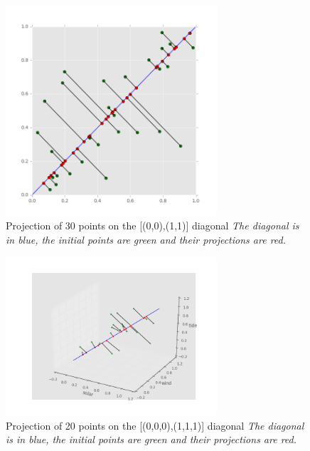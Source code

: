 \documentclass{article}
\begin{document}
\begin{figure}
  
    \includegraphics[width=0.7\textwidth]{proj2Ddiag0.png}
    \caption{Projection of 30 points on the [(0,0),(1,1)] diagonal \emph{The diagonal is in blue, the initial points are green and their projections are red.}}
\end{figure}

	\begin{figure}
  
    \includegraphics[width=0.7\textwidth]{proj3d.png}
    \caption{Projection of 20 points on the [(0,0,0),(1,1,1)] diagonal \emph{The diagonal is in blue, the initial points are green and their projections are red.}}
\end{figure}
	   
\end{document}

